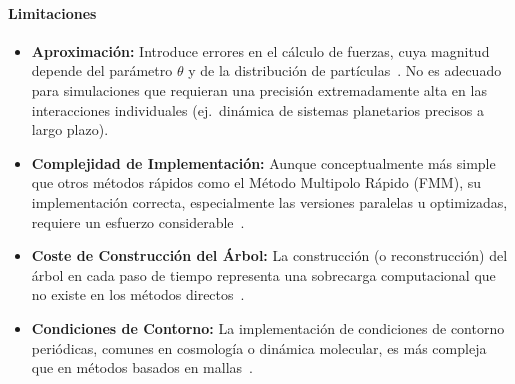 \paragraph{Limitaciones}
\begin{itemize}
    \item \textbf{Aproximación:} Introduce errores en el cálculo de fuerzas, cuya magnitud depende del parámetro $\theta$ y de la distribución de partículas~\cite{barnes1990, aguirre2020}. No es adecuado para simulaciones que requieran una precisión extremadamente alta en las interacciones individuales (ej.\ dinámica de sistemas planetarios precisos a largo plazo).
    \item \textbf{Complejidad de Implementación:} Aunque conceptualmente más simple que otros métodos rápidos como el Método Multipolo Rápido (FMM), su implementación correcta, especialmente las versiones paralelas u optimizadas, requiere un esfuerzo considerable~\cite{dubinski1996, salmon1991}.
    \item \textbf{Coste de Construcción del Árbol:} La construcción (o reconstrucción) del árbol en cada paso de tiempo representa una sobrecarga computacional que no existe en los métodos directos~\cite{salmon1991}.
    \item \textbf{Condiciones de Contorno:} La implementación de condiciones de contorno periódicas, comunes en cosmología o dinámica molecular, es más compleja que en métodos basados en mallas~\cite{bagla2004}.
\end{itemize}
